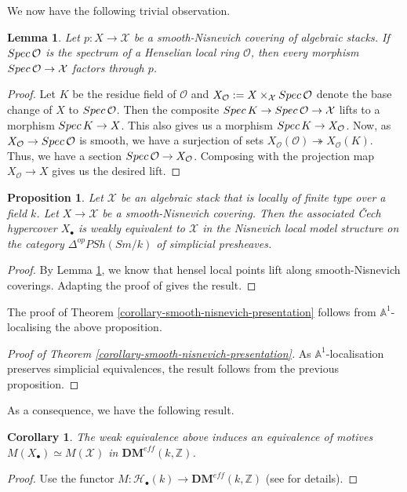 \documentclass[10pt]{amsart}
\theoremstyle{plain}
\newtheorem{lemma}[thm]{Lemma}
\newtheorem{corollary}[thm]{Corollary}
\newtheorem{proposition}[thm]{Proposition}
\theoremstyle{definition}
\newcommand{\Spec}{{\rm Spec \,}}
\newcommand{\sH}{{\mathcal H}}
\newcommand{\sO}{{\mathcal O}}
\newcommand{\sX}{{\mathcal X}}
\newcommand{\A}{{\mathbb A}}
\newcommand{\Z}{{\mathbb Z}}
\newcommand{\DM}[2]{\mathbf{DM}_{#2}^{\mathit{eff}}(#1)}
\begin{document}
We now have the following trivial observation.
\begin{lemma}\label{lemma-lift-hensel-local-points}
  Let $p \colon X\rightarrow\sX$ be a smooth-Nisnevich covering of algebraic stacks. If
  $\Spec \sO$ is the spectrum of a Henselian local ring $\sO$, then
  every morphism $\Spec \sO\rightarrow \sX$ factors through $p$.
\end{lemma}
\begin{proof}
	Let $K$ be the residue field of $\sO$ and $X_\sO:= X\times_\sX \Spec \sO$ denote the base change of $X$ to $\Spec \sO$. Then the composite $\Spec K \rightarrow \Spec \sO \rightarrow \sX$ lifts to a morphism $\Spec K \rightarrow X$. This also gives us a morphism $\Spec K \rightarrow X_\sO$. Now, as $X_\sO \rightarrow \Spec \sO$ is smooth, we have a surjection of sets $X_\sO(\sO)\twoheadrightarrow X_\sO(K)$. Thus, we have a section $\Spec \sO \rightarrow X_\sO$. Composing with the projection map $X_\sO \rightarrow X$ gives us the desired lift.
\end{proof}





\begin{proposition}
	Let $\sX$ be an algebraic stack that is locally of finite type over a field $k$. Let $X\rightarrow \sX$ be a smooth-Nisnevich covering. Then the associated \v{C}ech hypercover $X_{\bullet}$ is weakly equivalent to $\sX$ in the Nisnevich local model structure on the category $\Delta^{op}PSh (Sm/k)$ of simplicial presheaves.
\end{proposition}
\begin{proof}
	By Lemma \ref{lemma-lift-hensel-local-points}, we know that hensel local points lift along smooth-Nisnevich coverings. Adapting the proof of \cite[Theorem 1.2]{cdh20} gives the result.
\end{proof}

The proof of Theorem \ref{corollary-smooth-nisnevich-presentation} follows from $\A^1$-localising the above proposition.

\begin{proof}[Proof of Theorem \ref{corollary-smooth-nisnevich-presentation}]
	As $\A^1$-localisation preserves simplicial equivalences, the result follows from the previous proposition.
\end{proof}

As a consequence, we have the following result.

\begin{corollary}
	The weak equivalence above induces an equivalence of motives $M(X_{\bullet})\simeq M(\sX)$ in $\DM{k,\Z}{}$.
\end{corollary}
\begin{proof}
	Use the functor $M: \sH_{\bullet}(k)\rightarrow \DM{k,\Z}{}$ (see \cite{cdh20} for details).
\end{proof}
\end{document}
